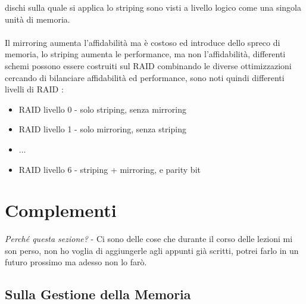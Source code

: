 \documentclass[12pt, letterpaper]{article}
\newcommand{\acc}{\\\hphantom{}\\}
\begin{document}
dischi sulla quale si applica lo striping sono visti a livello logico come una singola unità di memoria.\acc 
Il mirroring aumenta l'affidabilità ma è costoso ed introduce dello spreco di memoria, lo striping aumenta le performance, 
ma non l'affidabilità, differenti schemi possono essere costruiti sul RAID combinando le diverse ottimizzazioni 
cercando di bilanciare affidabilità ed performance, sono noti quindi differenti livelli di RAID : 
\begin{itemize}
    \item RAID livello 0 - solo striping, senza mirroring 
    \item RAID livello 1 - solo mirroring, senza striping 
    \item \(\dots\)
    \item RAID livello 6 - striping + mirroring, e parity bit
\end{itemize}
\newpage
\section{Complementi}
\textit{Perché questa sezione?} - Ci sono delle cose che durante il corso delle lezioni mi son perso, non ho voglia di 
aggiungerle agli appunti già scritti, potrei farlo in un futuro prossimo ma adesso non lo farò.
\subsection{Sulla Gestione della Memoria }
\end{document}
